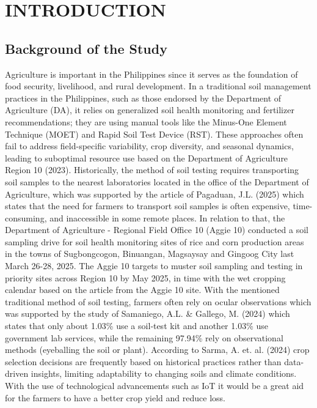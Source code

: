 \chapter{INTRODUCTION}

{\baselineskip
	
\section{Background of the Study}

Agriculture is important in the Philippines since it serves as the foundation of food security, livelihood, and rural development. In a traditional soil management practices in the Philippines, such as those endorsed by the Department of Agriculture (DA), it relies on generalized soil health monitoring and fertilizer recommendations; they are using manual tools like the Minus-One Element Technique (MOET) and Rapid Soil Test Device (RST). These approaches often fail to address field-specific variability, crop diversity, and seasonal dynamics, leading to suboptimal resource use based on the Department of Agriculture Region 10 (2023). Historically, the method of soil testing requires transporting soil samples to the nearest laboratories located in the office of the Department of Agriculture, which was supported by the article of Pagaduan, J.L. (2025) which states that the need for farmers to transport soil samples is often expensive, time-consuming, and inaccessible in some remote places. In relation to that, the Department of Agriculture - Regional Field Office 10 (Aggie 10) conducted a soil sampling drive for soil health monitoring sites of rice and corn production areas in the towns of Sugbongcogon, Binuangan, Magsaysay and Gingoog City last March 26-28, 2025. The Aggie 10 targets to muster soil sampling and testing in priority sites across Region 10 by May 2025, in time with the wet cropping calendar based on the article from the Aggie 10 site. With the mentioned traditional method of soil testing, farmers often rely on ocular observations which was supported by the study of Samaniego, A.L. \& Gallego, M. (2024) which states that only about 1.03\% use a soil‐test kit and another 1.03\% use government lab services, while the remaining 97.94\% rely on observational methods (eyeballing the soil or plant). According to Sarma, A. et. al. (2024) crop selection decisions are frequently based on historical practices rather than data-driven insights, limiting adaptability to changing soils and climate conditions. With the use of technological advancements such as IoT it would be a great aid for the farmers to have a better crop yield and reduce loss.

}
